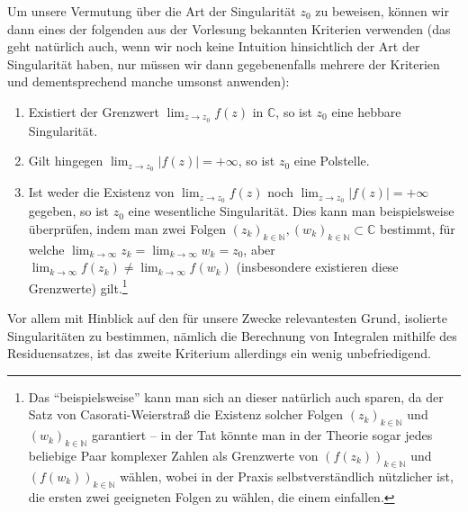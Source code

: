 \documentclass{article}
\theoremstyle{plain}
\theoremstyle{definition}
\begin{document}
\begin{itemize}
\begin{center}
	      \end{center}
\end{itemize}
Um unsere Vermutung über die Art der Singularität $z_0$ zu beweisen, können wir dann eines der folgenden aus der Vorlesung bekannten Kriterien verwenden (das geht natürlich auch, wenn wir noch keine Intuition hinsichtlich der Art der Singularität haben, nur müssen wir dann gegebenenfalls mehrere der Kriterien und dementsprechend manche umsonst anwenden):
\begin{tcolorbox}
	\begin{enumerate}[label=(\arabic*)]
		\item Existiert der Grenzwert $\lim_{z \to z_0} f(z)$ in $\mathbb{C}$, so ist $z_0$ eine hebbare Singularität.
		\item Gilt hingegen $\lim_{z \to z_0} |f(z)| = + \infty$, so ist $z_0$ eine Polstelle.
		\item Ist weder die Existenz von $\lim_{z \to z_0} f(z)$ noch $\lim_{z \to z_0} |f(z)| = + \infty$ gegeben, so ist $z_0$ eine wesentliche Singularität.
		      Dies kann man beispielsweise überprüfen, indem man zwei Folgen $(z_k)_{k \in \mathbb{N}}, (w_k)_{k \in \mathbb{N}} \subset \mathbb{C}$ bestimmt, für welche $\lim_{k \to \infty} z_k = \lim_{k \to \infty} w_k = z_0$, aber $\lim_{k \to \infty} f(z_k) \neq \lim_{k \to \infty} f(w_k)$ (insbesondere existieren diese Grenzwerte) gilt.\footnote{Das \enquote{beispielsweise} kann man sich an dieser natürlich auch sparen, da der Satz von Casorati-Weierstraß die Existenz solcher Folgen $(z_k)_{k \in \mathbb{N}}$ und $(w_k)_{k \in \mathbb{N}}$ garantiert -- in der Tat könnte man in der Theorie sogar jedes beliebige Paar komplexer Zahlen als Grenzwerte von $(f(z_k))_{k \in \mathbb{N}}$ und $(f(w_k))_{k \in\mathbb{N}}$ wählen, wobei in der Praxis selbstverständlich nützlicher ist, die ersten zwei geeigneten Folgen zu wählen, die einem einfallen.}
	\end{enumerate}
\end{tcolorbox}
Vor allem mit Hinblick auf den für unsere Zwecke relevantesten Grund, isolierte Singularitäten zu bestimmen, nämlich die Berechnung von Integralen mithilfe des Residuensatzes, ist das zweite Kriterium allerdings ein wenig unbefriedigend.
\end{document}
